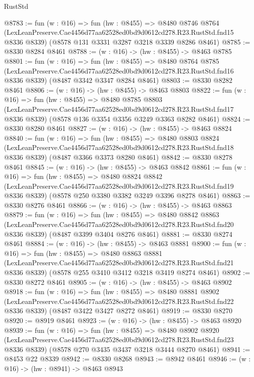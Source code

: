\begin{lexlean}{RustStd}
\begin{coremodule}
@8783 := fun (w : @16) =>
  fun (hw : @8455) =>
  @8480
    @8746
    @8764
    (LexLeanPreserve.Cae4456d77aa62528ed0bd9d0612cd278.R23.RustStd.fnd15 @8336 @8339)
    (@8578 @131 @3331 @3287 @3218 @3339 @8286 @8461)
@8785 := @8330 @8284 @8461
@8788 := (w : @16) -> (hw : @8455) -> @8463 @8785
@8801 := fun (w : @16) =>
  fun (hw : @8455) =>
  @8480
    @8764
    @8785
    (LexLeanPreserve.Cae4456d77aa62528ed0bd9d0612cd278.R23.RustStd.fnd16 @8336 @8339)
    (@8487 @3342 @3347 @8284 @8461)
@8803 := @8330 @8282 @8461
@8806 := (w : @16) -> (hw : @8455) -> @8463 @8803
@8822 := fun (w : @16) =>
  fun (hw : @8455) =>
  @8480
    @8785
    @8803
    (LexLeanPreserve.Cae4456d77aa62528ed0bd9d0612cd278.R23.RustStd.fnd17 @8336 @8339)
    (@8578 @136 @3354 @3356 @3249 @3363 @8282 @8461)
@8824 := @8330 @8280 @8461
@8827 := (w : @16) -> (hw : @8455) -> @8463 @8824
@8840 := fun (w : @16) =>
  fun (hw : @8455) =>
  @8480
    @8803
    @8824
    (LexLeanPreserve.Cae4456d77aa62528ed0bd9d0612cd278.R23.RustStd.fnd18 @8336 @8339)
    (@8487 @3366 @3373 @8280 @8461)
@8842 := @8330 @8278 @8461
@8845 := (w : @16) -> (hw : @8455) -> @8463 @8842
@8861 := fun (w : @16) =>
  fun (hw : @8455) =>
  @8480
    @8824
    @8842
    (LexLeanPreserve.Cae4456d77aa62528ed0bd9d0612cd278.R23.RustStd.fnd19 @8336 @8339)
    (@8578 @250 @3380 @3382 @3249 @3396 @8278 @8461)
@8863 := @8330 @8276 @8461
@8866 := (w : @16) -> (hw : @8455) -> @8463 @8863
@8879 := fun (w : @16) =>
  fun (hw : @8455) =>
  @8480
    @8842
    @8863
    (LexLeanPreserve.Cae4456d77aa62528ed0bd9d0612cd278.R23.RustStd.fnd20 @8336 @8339)
    (@8487 @3399 @3404 @8276 @8461)
@8881 := @8330 @8274 @8461
@8884 := (w : @16) -> (hw : @8455) -> @8463 @8881
@8900 := fun (w : @16) =>
  fun (hw : @8455) =>
  @8480
    @8863
    @8881
    (LexLeanPreserve.Cae4456d77aa62528ed0bd9d0612cd278.R23.RustStd.fnd21 @8336 @8339)
    (@8578 @255 @3410 @3412 @3218 @3419 @8274 @8461)
@8902 := @8330 @8272 @8461
@8905 := (w : @16) -> (hw : @8455) -> @8463 @8902
@8918 := fun (w : @16) =>
  fun (hw : @8455) =>
  @8480
    @8881
    @8902
    (LexLeanPreserve.Cae4456d77aa62528ed0bd9d0612cd278.R23.RustStd.fnd22 @8336 @8339)
    (@8487 @3422 @3427 @8272 @8461)
@8919 := @8330 @8270
@8920 := @8919 @8461
@8923 := (w : @16) -> (hw : @8455) -> @8463 @8920
@8939 := fun (w : @16) =>
  fun (hw : @8455) =>
  @8480
    @8902
    @8920
    (LexLeanPreserve.Cae4456d77aa62528ed0bd9d0612cd278.R23.RustStd.fnd23 @8336 @8339)
    (@8578 @270 @3435 @3437 @3218 @3444 @8270 @8461)
@8941 := @8453 @22 @8339
@8942 := @8330 @8268
@8943 := @8942 @8461
@8946 := (w : @16) -> (hw : @8941) -> @8463 @8943

\end{coremodule}
\end{lexlean}
